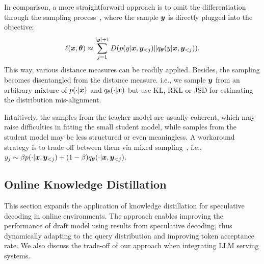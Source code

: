 In comparison, a more straightforward approach is to omit the differentiation through the sampling process~\citep{agarwal2023gkd}, where the sample ${\bm{y}}$ is directly plugged into the objective:
\begin{equation}
\label{eq:offline}
    \small
    \ell(\vx, \vtheta) \approx
 \sum_{j =1}^{|\vy|+1} D({p(y|\vx, \vy_{<j})} \Vert {q_\vtheta(y|\vx, \vy_{<j})} ).
\end{equation}
This way, various distance measures can be readily applied.
Besides, the sampling becomes disentangled from the distance measure. i.e., we sample ${\bm{y}}$ from an arbitrary mixture of ${p}(\cdot|{\bm{x}})$ and ${q}_\theta(\cdot|{\bm{x}})$ but use KL, RKL or JSD for estimating the distribution mis-alignment. 

Intuitively, the samples from the teacher model are usually coherent, which may raise difficulties in fitting the small student model, while samples from the student model may be less structured or even meaningless. 
A workaround strategy is to trade off between them via mixed sampling~\citep{gu2023knowledge}, i.e., $y_j \sim \beta{p(\cdot|{\bm{x}}, {\bm{y}}_{<j})} + (1-\beta) q_{\bm{\theta}}(\cdot|{\bm{x}}, {\bm{y}}_{<j})$. 







\subsection{Online Knowledge Distillation}
This section expands the application of knowledge distillation for speculative decoding in online environments. 
The approach enables improving the performance of draft model using results from speculative decoding, 
thus dynamically adapting to the query distribution and improving token acceptance rate. 
We also discuss the trade-off of our approach when integrating LLM serving systems.



